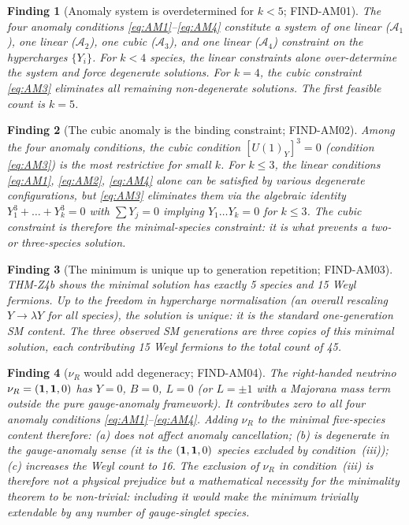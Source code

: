 \documentclass[12pt, a4paper]{article}
\newtheorem{finding}{Finding}[section]
\begin{document}
\begin{finding}[Anomaly system is overdetermined for $k < 5$;
  FIND-AM01]
The four anomaly conditions \eqref{eq:AM1}--\eqref{eq:AM4}
constitute a system of one linear ($\mathcal{A}_1$), one linear
($\mathcal{A}_2$), one cubic ($\mathcal{A}_3$), and one linear
($\mathcal{A}_4$) constraint on the hypercharges $\{Y_i\}$.
For $k < 4$ species, the linear constraints alone over-determine
the system and force degenerate solutions. For $k = 4$, the
cubic constraint \eqref{eq:AM3} eliminates all remaining
non-degenerate solutions. The first feasible count is $k = 5$.
\end{finding}

\begin{finding}[The cubic anomaly is the binding constraint;
  FIND-AM02]
Among the four anomaly conditions, the cubic condition
$[U(1)_Y]^3 = 0$ (condition \eqref{eq:AM3}) is the most
restrictive for small $k$. For $k \leq 3$, the linear conditions
\eqref{eq:AM1}, \eqref{eq:AM2}, \eqref{eq:AM4} alone can be
satisfied by various degenerate configurations, but \eqref{eq:AM3}
eliminates them via the algebraic identity
$Y_1^3 + \ldots + Y_k^3 = 0$ with $\sum Y_j = 0$ implying
$Y_1 \ldots Y_k = 0$ for $k \leq 3$. The cubic constraint is
therefore the minimal-species constraint: it is what prevents a
two- or three-species solution.
\end{finding}

\begin{finding}[The minimum is unique up to generation repetition;
  FIND-AM03]
THM-Z4b shows the minimal solution has exactly 5 species and
15 Weyl fermions. Up to the freedom in hypercharge normalisation
(an overall rescaling $Y \to \lambda Y$ for all species), the
solution is unique: it is the standard one-generation SM content.
The three observed SM generations are three copies of this minimal
solution, each contributing 15 Weyl fermions to the total count
of 45.
\end{finding}

\begin{finding}[$\nu_R$ would add degeneracy; FIND-AM04]
The right-handed neutrino $\nu_R = ({\bf 1}, {\bf 1}, 0)$ has
$Y = 0$, $B = 0$, $L = 0$ (or $L = \pm 1$ with a Majorana mass
term outside the pure gauge-anomaly framework). It contributes
zero to all four anomaly conditions \eqref{eq:AM1}--\eqref{eq:AM4}.
Adding $\nu_R$ to the minimal five-species content therefore:
(a) does not affect anomaly cancellation; (b) is degenerate in
the gauge-anomaly sense (it is the $({\bf 1},{\bf 1},0)$ species
excluded by condition~(iii)); (c) increases the Weyl count to 16.
The exclusion of $\nu_R$ in condition~(iii) is therefore not a
physical prejudice but a mathematical necessity for the minimality
theorem to be non-trivial: including it would make the minimum
trivially extendable by any number of gauge-singlet species.
\end{finding}
\end{document}
